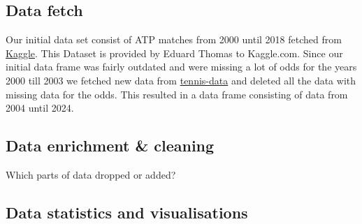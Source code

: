 \documentclass[preprint,aps,nofootinbib,a4paper,superscriptaddress,longbibliography,amsfonts,amssymb,amsmath,titlepage]{revtex4-2}
\begin{document}
\subsection{Data fetch}

Our initial data set consist of ATP matches from 2000 until 2018 fetched from \href{https://www.kaggle.com/datasets/edouardthomas/atp-matches-dataset}{Kaggle}. This Dataset is provided by Eduard Thomas to Kaggle.com. Since our initial data frame was fairly outdated and were missing a lot of odds for the years 2000 till 2003 we fetched new data from \href{http://tennis-data.co.uk/}{tennis-data} and deleted all the data with missing data for the odds. This resulted in a data frame consisting of data from 2004 until 2024.

\subsection{Data enrichment \& cleaning}
Which parts of data dropped or added?

\subsection{Data statistics and visualisations}
\end{document}
